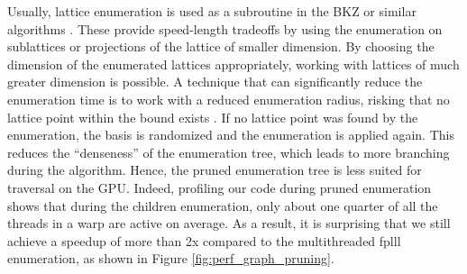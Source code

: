 \documentclass{scrartcl}
\begin{document}
    Usually, lattice enumeration is used as a subroutine in the BKZ or similar algorithms \cite{bkz}. 
    These provide speed-length tradeoffs by using the enumeration on sublattices or projections of the lattice of smaller dimension. 
    By choosing the dimension of the enumerated lattices appropriately, working with lattices of much greater dimension is possible. 
    A technique that can significantly reduce the enumeration time is to work with a reduced enumeration radius, risking that no lattice point within the bound exists \cite{pruning, bkz2}. 
    If no lattice point was found by the enumeration, the basis is randomized and the enumeration is applied again. 
    This reduces the ``denseness'' of the enumeration tree, which leads to more branching during the algorithm. 
    Hence, the pruned enumeration tree is less suited for traversal on the GPU. 
    Indeed, profiling our code during pruned enumeration shows that during the children enumeration, only about one quarter of all the threads in a warp are active on average.
    As a result, it is surprising that we still achieve a speedup of more than 2x compared to the multithreaded fplll enumeration, as shown in Figure \ref{fig:perf_graph_pruning}.
\end{document}
